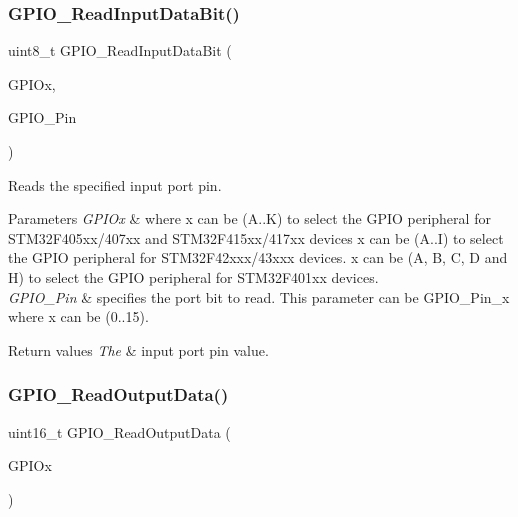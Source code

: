 \subsubsection{\texorpdfstring{G\+P\+I\+O\+\_\+\+Read\+Input\+Data\+Bit()}{GPIO\_ReadInputDataBit()}}
{\footnotesize\ttfamily uint8\+\_\+t G\+P\+I\+O\+\_\+\+Read\+Input\+Data\+Bit (\begin{DoxyParamCaption}\item[{G\+P\+I\+O\+\_\+\+Type\+Def $\ast$}]{G\+P\+I\+Ox,  }\item[{uint16\+\_\+t}]{G\+P\+I\+O\+\_\+\+Pin }\end{DoxyParamCaption})}



Reads the specified input port pin. 


\begin{DoxyParams}{Parameters}
{\em G\+P\+I\+Ox} & where x can be (A..K) to select the G\+P\+IO peripheral for S\+T\+M32\+F405xx/407xx and S\+T\+M32\+F415xx/417xx devices x can be (A..I) to select the G\+P\+IO peripheral for S\+T\+M32\+F42xxx/43xxx devices. x can be (A, B, C, D and H) to select the G\+P\+IO peripheral for S\+T\+M32\+F401xx devices. \\
\hline
{\em G\+P\+I\+O\+\_\+\+Pin} & specifies the port bit to read. This parameter can be G\+P\+I\+O\+\_\+\+Pin\+\_\+x where x can be (0..15). \\
\hline
\end{DoxyParams}

\begin{DoxyRetVals}{Return values}
{\em The} & input port pin value. \\
\hline
\end{DoxyRetVals}
\mbox{\label{group___g_p_i_o___group2_gaf8938a34280b7dc3e39872a7c17bb323}} 
\subsubsection{\texorpdfstring{G\+P\+I\+O\+\_\+\+Read\+Output\+Data()}{GPIO\_ReadOutputData()}}
{\footnotesize\ttfamily uint16\+\_\+t G\+P\+I\+O\+\_\+\+Read\+Output\+Data (\begin{DoxyParamCaption}\item[{G\+P\+I\+O\+\_\+\+Type\+Def $\ast$}]{G\+P\+I\+Ox }\end{DoxyParamCaption})}



